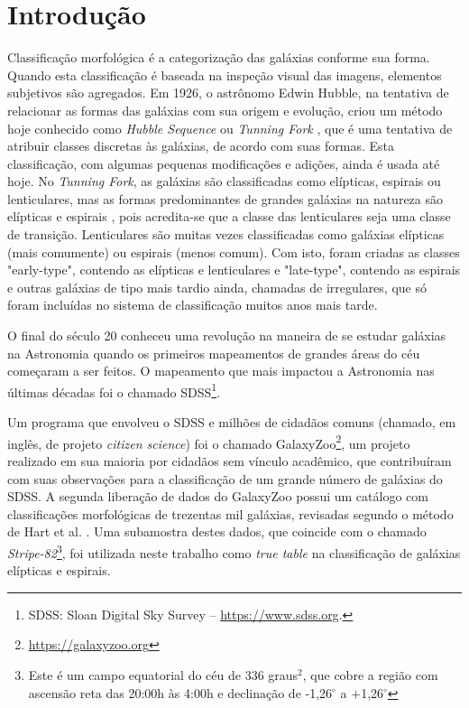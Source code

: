 \section{Introdução}
\label{sec:intro}
Classificação morfológica é a categorização das galáxias conforme sua forma. Quando esta classificação é baseada na inspeção visual das imagens, elementos subjetivos são agregados. Em 1926, o astrônomo Edwin Hubble, na tentativa de relacionar as formas das galáxias com sua origem e evolução, criou um método hoje conhecido como \emph{Hubble Sequence} ou \emph{Tunning Fork} \cite{hubble1926, fortson2012}, que é uma tentativa de atribuir classes discretas às galáxias, de acordo com suas formas. Esta classificação, com algumas pequenas modificações e adições, ainda é usada até hoje.  No \emph{Tunning Fork}, as galáxias são classificadas como elípticas, espirais ou lenticulares, mas as formas predominantes de grandes galáxias na natureza são elípticas e espirais \cite{fortson2012}, pois acredita-se que a classe das lenticulares seja uma classe de transição. Lenticulares são muitas vezes classificadas como galáxias elípticas (mais comumente) ou espirais (menos comum). Com isto, foram criadas as classes "early-type", contendo as elípticas e lenticulares e "late-type", contendo as espirais e outras galáxias de tipo mais tardio ainda, chamadas de irregulares, que só foram incluídas no sistema de classificação muitos anos mais tarde.

O final do século 20 conheceu uma revolução na maneira de se estudar galáxias na Astronomia quando os primeiros mapeamentos de grandes áreas do céu começaram a ser feitos. O mapeamento que mais impactou a Astronomia nas últimas décadas foi o chamado SDSS\footnote{SDSS: Sloan Digital Sky Survey -- \url{https://www.sdss.org}.}.

Um programa que envolveu o SDSS e milhões de cidadãos comuns (chamado, em inglês, de projeto \emph{citizen science}) foi o chamado GalaxyZoo\footnote{\url{https://galaxyzoo.org}}, um projeto realizado em sua maioria por cidadãos sem vínculo acadêmico, que contribuíram com suas observações para a classificação de um grande número de galáxias do SDSS. A segunda liberação de dados do GalaxyZoo possui um catálogo com classificações morfológicas de trezentas mil galáxias, revisadas segundo o método de Hart et al. \cite{hart2016}. Uma subamostra destes dados, que coincide com o chamado \emph{Stripe-82}\footnote{Este é um campo equatorial do céu de 336 graus$^{2}$, que cobre a região com ascensão reta das 20:00h às 4:00h e declinação de -1,26$^{\circ}$ a +1,26$^{\circ}$}, foi utilizada neste trabalho como \emph{true table} na classificação de galáxias elípticas e espirais.

